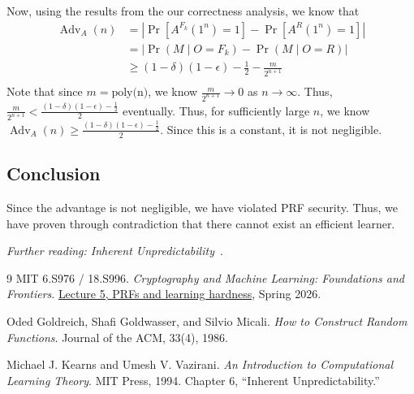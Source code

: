 \documentclass[11pt,fleqn]{article}
\newcommand{\eps}{\epsilon}
\newcommand{\Adv}{\operatorname{Adv}}
\begin{document}
Now, using the results from the our correctness analysis, we know that
\begin{align*}
    \Adv_A(n) &= |\Pr[A^{F_k}(1^n) = 1] - \Pr[A^{R}(1^n) = 1]|\\
    &= |\Pr(M \mid O = F_k) - \Pr(M \mid O= R)|\\
    &\geq (1 - \delta)(1 - \eps) -  \frac{1}{2} - \frac{m}{2^{n+1}} \\
\end{align*}
Note that since $m = \text{poly(n)}$, we know $\frac{m}{2^{n+1}} \to 0$ as $n \to \infty$. Thus, $\frac{m}{2^{n+1}} < \frac{(1 - \delta)(1 - \eps) -  \frac{1}{2}}{2}$ eventually. Thus, for sufficiently large $n$, we know $\Adv_A(n) \geq \frac{(1 - \delta)(1 - \eps) -  \frac{1}{2}}{2}$. Since this is a constant, it is not negligible.

\subsection{Conclusion}

Since the advantage is not negligible, we have violated PRF security. Thus, we have proven through contradiction that there cannot exist an efficient learner.

\emph{Further reading: Inherent Unpredictability}~\cite{kv}.

\begin{thebibliography}{9}
MIT 6.S976 / 18.S996.
\emph{Cryptography and Machine Learning: Foundations and Frontiers}.
\href{https://mlcrypto.mit.edu/course/slides/lec5.pdf#page=47}
{Lecture 5, PRFs and learning hardness}, Spring 2026.

Oded Goldreich, Shafi Goldwasser, and Silvio Micali.
\emph{How to Construct Random Functions}.
Journal of the ACM, 33(4), 1986.

Michael J. Kearns and Umesh V. Vazirani.
\emph{An Introduction to Computational Learning Theory}.
MIT Press, 1994. Chapter 6, ``Inherent Unpredictability.''
\end{thebibliography}
\end{document}

